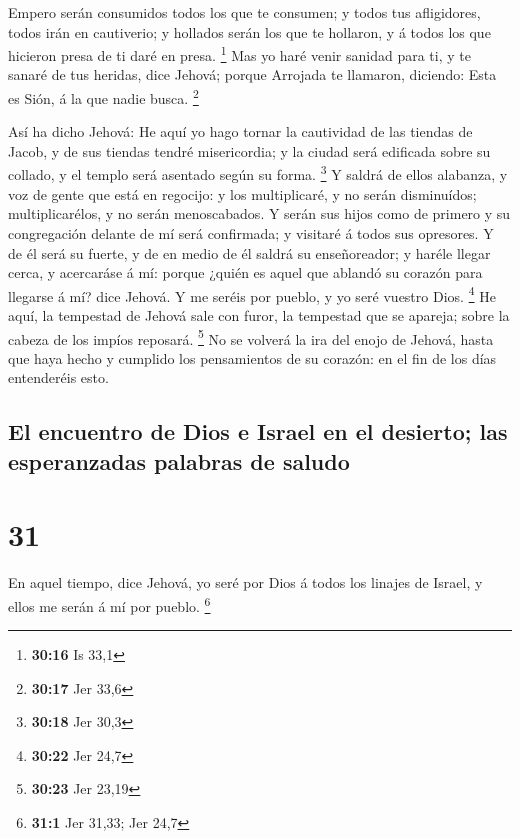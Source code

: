  Empero serán consumidos todos los que te consumen; y todos
tus afligidores, todos irán en cautiverio; y hollados serán los que te
hollaron, y á todos los que hicieron presa de ti daré en presa.
\footnote{\textbf{30:16} Is 33,1}  Mas yo haré venir
sanidad para ti, y te sanaré de tus heridas, dice Jehová; porque
Arrojada te llamaron, diciendo: Esta es Sión, á la que nadie busca.
\footnote{\textbf{30:17} Jer 33,6}

 Así ha dicho Jehová: He aquí yo hago tornar la cautividad
de las tiendas de Jacob, y de sus tiendas tendré misericordia; y la
ciudad será edificada sobre su collado, y el templo será asentado según
su forma. \footnote{\textbf{30:18} Jer 30,3}  Y saldrá de
ellos alabanza, y voz de gente que está en regocijo: y los multiplicaré,
y no serán disminuídos; multiplicarélos, y no serán menoscabados.
 Y serán sus hijos como de primero y su congregación
delante de mí será confirmada; y visitaré á todos sus opresores.
 Y de él será su fuerte, y de en medio de él saldrá su
enseñoreador; y haréle llegar cerca, y acercaráse á mí: porque ¿quién es
aquel que ablandó su corazón para llegarse á mí? dice Jehová.
 Y me seréis por pueblo, y yo seré vuestro Dios.
\footnote{\textbf{30:22} Jer 24,7}  He aquí, la tempestad
de Jehová sale con furor, la tempestad que se apareja; sobre la cabeza
de los impíos reposará. \footnote{\textbf{30:23} Jer 23,19}
 No se volverá la ira del enojo de Jehová, hasta que haya
hecho y cumplido los pensamientos de su corazón: en el fin de los días
entenderéis esto.

\hypertarget{el-encuentro-de-dios-e-israel-en-el-desierto-las-esperanzadas-palabras-de-saludo}{%
\subsection{El encuentro de Dios e Israel en el desierto; las
esperanzadas palabras de
saludo}\label{el-encuentro-de-dios-e-israel-en-el-desierto-las-esperanzadas-palabras-de-saludo}}

\hypertarget{section-30}{%
\section{31}\label{section-30}}

 En aquel tiempo, dice Jehová, yo seré por Dios á todos los
linajes de Israel, y ellos me serán á mí por pueblo. \footnote{\textbf{31:1}
  Jer 31,33; Jer 24,7}

